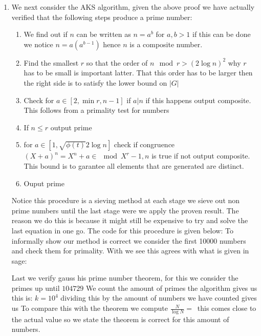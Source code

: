 \documentclass[../Main.tex]{subfiles}
\begin{document}
\begin{enumerate}
\item We next consider the AKS algorithm, given the above proof we have actually verified that the following steps produce a prime number:
\begin{enumerate}
    \item We find out if $n$ can be written as $n=a^b$ for $a,b>1$ if this can be  done we notice $n=a(a^{b-1})$ hence $n$ is a composite number. 
    \item Find the smallest $r$ so that the order of $n\mod{r}>(2\log{n})^2$ why $r$ has to be small is important latter. That this order has to be larger then the right side is to satisfy the lower bound on $|G|$
    \item Check for  $a\in [2,\min{r,n-1}]$ if $a|n$ if this happens output composite. This follows from a primality test for numbers 
    \item If $n\leq r$ output prime 
    \item for $a\in [1,\sqrt{\phi(t)}2\log{n}]$
    check if congruence $(X+a)^n= X^n+a\in \mod{X^r-1,n}$ is true if not output composite. This bound is to garantee all elements that are generated are distinct. 
    \item Ouput prime 
\end{enumerate}
Notice this procedure is a sieving method at each stage we sieve out non prime numbers until the last stage were we apply the proven result. The reason we do this is because it might still be expensive to try and solve the last equation in one go. The code for this procedure is given below:
To informally show our method is correct we consider the first 10000 numbers and check them for primality. With we see this agrees with what is given in sage:


Last we verify gauss his prime number theorem, for this we consider the primes up until $104729$ We count the amount of primes the algorithm gives us this is: $k = 10^4$ dividing this by the amount of numbers we have counted gives us  To compare this with the theorem we compute $\frac{N}{\log{N}}=\frac{}{}$ this comes close to the actual value so we state the theorem is correct for this amount of numbers.  

\end{enumerate}
\end{document}
